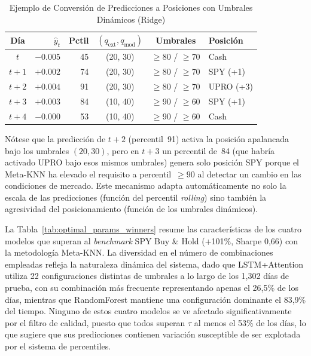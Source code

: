 \begin{table}[H]
\centering
\caption{Ejemplo de Conversi\'on de Predicciones a Posiciones con Umbrales Din\'amicos (Ridge)}
\label{tab:ejemplo_posiciones}
\small
\begin{tabular}{@{}crrccl@{}}
\toprule
\textbf{D\'ia} & $\hat{y}_t$ & \textbf{Pctil} & $(q_{\text{ext}}, q_{\text{mod}})$ & \textbf{Umbrales} & \textbf{Posici\'on} \\
\midrule
$t$ & $-0.005$ & 45 & (20, 30) & $\geq$80 / $\geq$70 & Cash \\
$t{+}1$ & $+0.002$ & 74 & (20, 30) & $\geq$80 / $\geq$70 & SPY (+1) \\
$t{+}2$ & $+0.004$ & 91 & (20, 30) & $\geq$80 / $\geq$70 & UPRO (+3) \\
$t{+}3$ & $+0.003$ & 84 & (10, 40) & $\geq$90 / $\geq$60 & SPY (+1) \\
$t{+}4$ & $-0.000$ & 53 & (10, 40) & $\geq$90 / $\geq$60 & Cash \\
\bottomrule
\end{tabular}
\end{table}

N\'otese que la predicci\'on de $t{+}2$ (percentil~91) activa la posici\'on apalancada bajo los umbrales $(20, 30)$, pero en $t{+}3$ un percentil de~84 (que habr\'ia activado UPRO bajo esos mismos umbrales) genera solo posici\'on SPY porque el Meta-KNN ha elevado el requisito a percentil~$\geq 90$ al detectar un cambio en las condiciones de mercado. Este mecanismo adapta autom\'aticamente no solo la escala de las predicciones (funci\'on del percentil \textit{rolling}) sino tambi\'en la agresividad del posicionamiento (funci\'on de los umbrales din\'amicos).

La Tabla~\ref{tab:optimal_params_winners} resume las caracter\'isticas de los cuatro modelos que superan al \textit{benchmark} SPY Buy \& Hold (+101\%, Sharpe 0{,}66) con la metodolog\'ia Meta-KNN. La diversidad en el n\'umero de combinaciones empleadas refleja la naturaleza din\'amica del sistema, dado que LSTM+Attention utiliza 22 configuraciones distintas de umbrales a lo largo de los 1{,}302 d\'ias de prueba, con su combinaci\'on m\'as frecuente representando apenas el 26{,}5\% de los d\'ias, mientras que RandomForest mantiene una configuraci\'on dominante el 83{,}9\% del tiempo. Ninguno de estos cuatro modelos se ve afectado significativamente por el filtro de calidad, puesto que todos superan $\tau$ al menos el 53\% de los d\'ias, lo que sugiere que sus predicciones contienen variaci\'on susceptible de ser explotada por el sistema de percentiles.

